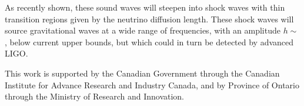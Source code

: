 \documentclass[aps,showpacs,twocolumn,floats,prd,superscriptaddress,nofootinbib]{revtex4}
\begin{document}
As recently shown\cite{2015arXiv151002985P}, these sound waves will
steepen into shock waves with thin transition regions given by the
neutrino diffusion length\cite{2014PhRvL.113f1301J}.  These shock
waves will source gravitational waves at a wide range of frequencies,
with an amplitude $h\sim$, below current upper
bounds\cite{2015PhRvD..91b2003A}, but which could in turn be detected
by advanced LIGO.



\acknowledgments


This work is supported by the Canadian Government through the Canadian
Institute for Advance Research and Industry Canada, and by Province of
Ontario through the Ministry of Research and Innovation.

\appendix

%

\end{document}
